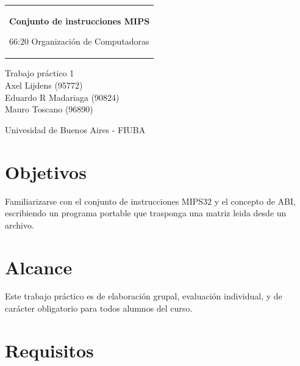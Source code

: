 \documentclass[11pt,a4paper]{article}
\begin{document}

\begin{titlepage}
  \noindent%
  \begin{tabular}{@{}p{\textwidth}@{}}
    \vspace{0.2cm}
    \begin{center}
    \Huge{\textbf{
      Conjunto de instrucciones MIPS
    }}
    \end{center}
    \begin{center}
      \Large{
         66:20 Organizaci\'on de Computadoras
      }
    \end{center}
    \vspace{0.2cm}\\
  \end{tabular}
  \vspace{4 cm}
  \begin{center}
    {\large
      Trabajo práctico 1
    }\\
    \vspace{0.6cm}
    {\Large
      Axel Lijdens (95772)\\
      Eduardo R Madariaga (90824)\\
      Mauro Toscano (96890)
    }
  \end{center}
  \vfill
  \begin{center}
  Univesidad de Buenos Aires - FIUBA
  \end{center}
\end{titlepage}


\tableofcontents
\pagebreak

\section{Objetivos}

Familiarizarse con el conjunto de instrucciones MIPS32 y el concepto de
ABI, escribiendo un programa portable que trasponga una matriz leida desde un archivo.

\section{Alcance}

Este trabajo práctico es de elaboración grupal, evaluación individual, y de carácter obligatorio para todos alumnos del curso.

\section{Requisitos}
\end{document}
